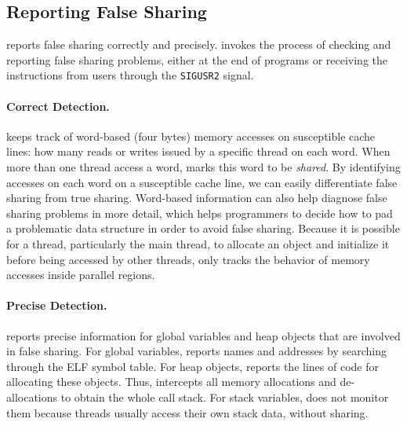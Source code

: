  \subsection{Reporting False Sharing}
\label{sec:report}

\Cheetah{} reports false sharing correctly and precisely. \Cheetah{} invokes the process of checking and reporting false sharing problems, either at the end of programs or receiving the instructions from users through the \texttt{SIGUSR2} signal.  

\paragraph{Correct Detection.} \Cheetah{} keeps track of word-based (four bytes) memory accesses on susceptible cache lines: how many reads or writes issued by a specific thread on each word. When more than one thread access a word, \Cheetah{} marks this word to be \emph{shared}. By identifying accesses on each word on a susceptible cache line, we can easily differentiate false sharing from true sharing. Word-based information can also help diagnose false sharing problems in more detail, which helps programmers to decide how to pad a problematic data structure in order to avoid false sharing. Because it is possible for a thread, particularly the main thread, to allocate an object and initialize it before being accessed by other threads, \cheetah{} only tracks the behavior of memory accesses inside parallel regions.

\paragraph{Precise Detection.} \Cheetah{} reports precise information for global variables and heap objects that are involved in false sharing. For global variables, \Cheetah{} reports names and addresses by searching through the ELF symbol table. For heap objects, \Cheetah{} reports the lines of code for allocating these objects. Thus, \Cheetah{} intercepts all memory allocations and de-allocations to obtain the whole call stack. For stack variables, \cheetah{} does not monitor them because threads usually access their own stack data, without sharing.  

